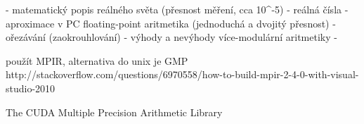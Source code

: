 - matematický popis reálného světa (přesnost měření, cca 10^-5) - reálná čísla
- aproximace v PC floating-point aritmetika (jednoduchá a dvojitý přesnost) - ořezávání (zaokrouhlování)
- výhody a nevýhody více-modulární aritmetiky
- 

použít MPIR, alternativa do unix je GMP
http://stackoverflow.com/questions/6970558/how-to-build-mpir-2-4-0-with-visual-studio-2010

The CUDA Multiple Precision Arithmetic Library
